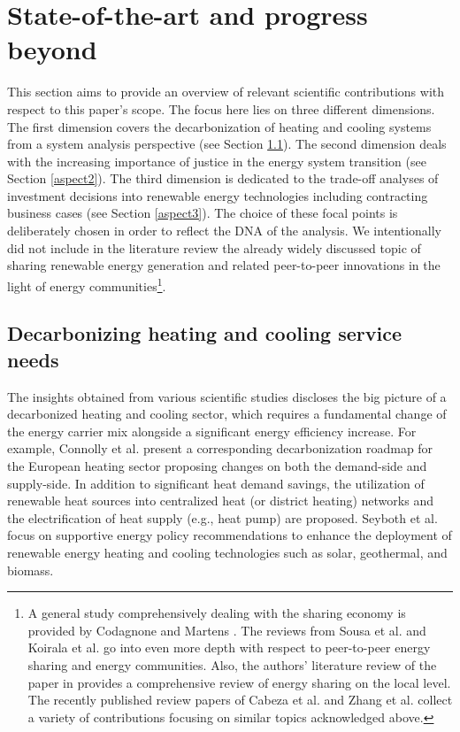 \section{State-of-the-art and progress beyond}\label{stateoftheart}
This section aims to provide an overview of relevant scientific contributions with respect to this paper's scope. The focus here lies on three different dimensions. The first dimension covers the decarbonization of heating and cooling systems from a system analysis perspective (see Section \ref{aspect1}). The second dimension deals with the increasing importance of justice in the energy system transition (see Section \ref{aspect2}). The third dimension is dedicated to the trade-off analyses of investment decisions into renewable energy technologies including contracting business cases (see Section \ref{aspect3}). The choice of these focal points is deliberately chosen in order to reflect the DNA of the analysis. We intentionally did not include in the literature review the already widely discussed topic of sharing renewable energy generation and related peer-to-peer innovations in the light of energy communities\footnote{A general study comprehensively dealing with the sharing economy is provided by Codagnone and Martens \cite{codagnone2016scoping}. The reviews from Sousa et al. \cite{sousa2019peer} and Koirala et al. \cite{koirala2016energetic} go into even more depth with respect to peer-to-peer energy sharing and energy communities. Also, the authors' literature review of the paper in \cite{zwickl2021open} provides a comprehensive review of energy sharing on the local level. The recently published review papers of Cabeza et al. \cite{cabeza2018integration} and Zhang et al. \cite{zhang2019review} collect a variety of contributions focusing on similar topics acknowledged above.}.

\subsection{Decarbonizing heating and cooling service needs}\label{aspect1}
The insights obtained from various scientific studies discloses the big picture of a decarbonized heating and cooling sector, which requires a fundamental change of the energy carrier mix alongside a significant energy efficiency increase. For example, Connolly et al. \cite{connolly2014heat} present a corresponding decarbonization roadmap for the European heating sector proposing changes on both the demand-side and supply-side. In addition to significant heat demand savings, the utilization of renewable heat sources into centralized heat (or district heating) networks and the electrification of heat supply (e.g., heat pump) are proposed. Seyboth et al. \cite{seyboth2008recognising} focus on supportive energy policy recommendations to enhance the deployment of renewable energy heating and cooling technologies such as solar, geothermal, and biomass.\vspace{0.5cm}

